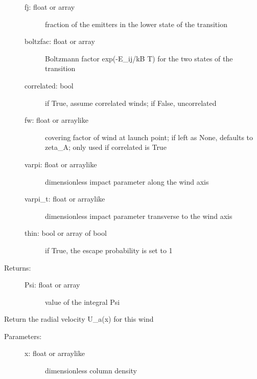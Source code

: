 \documentclass[letterpaper,10pt,english]{sphinxmanual}
\begin{document}
\begin{fulllineitems}
\begin{fulllineitems}
\begin{description}
\begin{description}
\item[{fj: float or array}] \leavevmode
fraction of the emitters in the lower state of the
transition

\item[{boltzfac: float or array}] \leavevmode
Boltzmann factor exp(-E\_ij/kB T) for the two states of
the transition

\item[{correlated: bool}] \leavevmode
if True, assume correlated winds; if False, uncorrelated

\item[{fw: float or arraylike}] \leavevmode
covering factor of wind at launch point; if left as
None, defaults to zeta\_A; only used if correlated is True

\item[{varpi: float or arraylike}] \leavevmode
dimensionless impact parameter along the wind axis

\item[{varpi\_t: float or arraylike}] \leavevmode
dimensionless impact parameter transverse to the wind axis

\item[{thin: bool or array of bool}] \leavevmode
if True, the escape probability is set to 1

\end{description}

\item[{Returns:}] \leavevmode\begin{description}
\item[{Psi: float or array}] \leavevmode
value of the integral Psi

\end{description}

\end{description}

\end{fulllineitems}


\begin{fulllineitems}
\label{fulldoc:despotic.winds.pwind.U}
Return the radial velocity U\_a(x) for this wind
\begin{description}
\item[{Parameters:}] \leavevmode\begin{description}
\item[{x: float or arraylike}] \leavevmode
dimensionless column density


\end{description}
\end{description}
\end{fulllineitems}
\end{fulllineitems}
\end{document}
